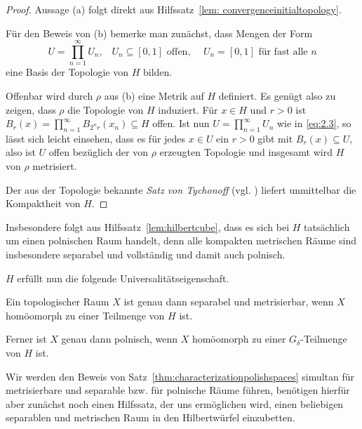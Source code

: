 \documentclass[../main/main.tex]{subfiles}
\begin{document}
	\begin{proof}
		Aussage (a) folgt direkt aus Hilfssatz~\ref{lem: convergenceinitialtopology}.
		
		Für den Beweis von (b) bemerke man zunächst, dass Mengen der Form 
		\[U = \prod_{n=1}^{\infty} U_n\text{,} \quad U_n \subseteq [0, 1] \text{ offen, }
		\quad U_n = [0, 1] \text{ für fast alle } n \label{eq:2.3} \tag{2.3}\]
		eine Basis der Topologie von $H$ bilden.
		
		Offenbar wird durch $\rho$ aus (b) eine Metrik auf $H$ definiert. 
		Es genügt also zu zeigen, dass $\rho$ die Topologie von $H$ induziert. 
		Für $x \in H$ und $r > 0$ ist 
		$B_r(x) = \prod_{n=1}^{\infty} B_{2^n r}(x_n) \subseteq H$ 
		offen. Ist nun $U = \prod_{n=1}^{\infty} U_n$ wie in \eqref{eq:2.3}, 
		so lässt sich leicht einsehen, dass es für jedes $x \in U$ ein $r > 0$ 
		gibt mit $B_r(x) \subseteq U$, also ist $U$ offen bezüglich der von $\rho$ 
		erzeugten Topologie und insgesamt wird $H$ von $\rho$ metrisiert.
		
		Der aus der Topologie bekannte \emph{Satz von Tychonoff} (vgl. \cite[Satz 2.7.1]{Simon.2015}) liefert 
		unmittelbar die Kompaktheit von $H$.
	\end{proof}
	
	\begin{Bemerkung}
		Insbesondere folgt aus Hilfssatz~\ref{lem:hilbertcube}, dass es sich bei $H$ tatsächlich um einen polnischen Raum handelt, 
		denn alle kompakten metrischen Räume sind insbesondere 
		separabel und vollständig und damit auch polnisch.
	\end{Bemerkung}
	
	$H$ erfüllt nun die folgende Universalitätseigenschaft.
	
	\begin{Satz}
		\label{thm:characterizationpolishspaces}
		Ein topologischer Raum $X$ ist genau dann separabel und metrisierbar, wenn $X$ homöomorph zu einer Teilmenge von $H$ ist.
		
		Ferner ist $X$ genau dann polnisch, wenn $X$ homöomorph zu einer $G_\delta$-Teilmenge von $H$ ist.
	\end{Satz}
	
	Wir werden den Beweis von Satz~\ref{thm:characterizationpolishspaces} simultan für metrisierbare und 
	separable bzw. für polnische Räume führen, benötigen hierfür aber zunächst noch einen Hilfssatz, der uns ermöglichen wird, 
	einen beliebigen separablen und metrischen Raum in den Hilbertwürfel einzubetten.
	
\end{document}
